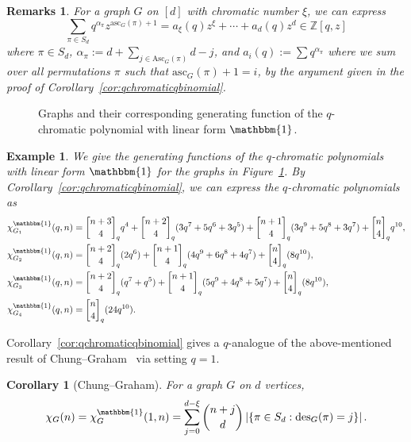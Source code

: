 \documentclass[11pt]{amsart}
\newtheorem{corollary}[theorem]{Corollary}
\newtheorem{exam}{Example}
\newenvironment{example}{\begin{exam}\sf}{\end{exam}}
\newtheorem*{rem}{Remarks}
\newenvironment{remark}{\begin{rem}\sf}{\end{rem}}
\newcommand{\asc}{\mathrm{Asc}}
\newcommand{\desnum}{\mathrm{des}}
\newcommand{\ascnum}{\mathrm{asc}}
\newcommand{\qbinom}[2]{\genfrac[]{0pt}{}{#1}{#2}_q}
\begin{document}
\begin{remark}
    For a graph $G$ on $[d]$ with chromatic number $\xi$, we can express
    \[
        \sum_{\pi \in S_d} q^{\alpha_\pi} z^{\ascnum_G(\pi)+1} = a_\xi (q) z^\xi+ \cdots + a_d(q) z^d \in
\mathbb{Z}[q,z]
    \]
    where $\pi \in S_d$, $\alpha_\pi := d+\sum_{j \in \asc_G(\pi)} d-j$, and $a_i(q) := \sum q^{\alpha_\pi}$ where we sum over all permutations $\pi$ such that $\ascnum_G(\pi)+1 = i$, by the argument given in the proof of Corollary~\ref{cor:qchromaticqbinomial}.
\end{remark}

\begin{figure}
    \centering
    
    \caption{Graphs and their corresponding generating function of the $q$-chromatic polynomial with linear form $\mathbbm{1}$.}
    \label{fig:numeratorpolynomial}
\end{figure}

\begin{example}\label{ex:qchromaticgenfunction}
    We give the generating functions of the $q$-chromatic polynomials with linear form $\mathbbm{1}$ for the
graphs in Figure~\ref{fig:numeratorpolynomial}. 
    By Corollary~\ref{cor:qchromaticqbinomial}, we can express the $q$-chromatic polynomials as
\begin{align*}
        \chi_{G_1}^\mathbbm{1}(q,n) &= \qbinom{n+3}{4} q^4 + \qbinom{n+2}{4} (3q^7+5q^6+3q^5) + \qbinom{n+1}{4} (3 q^9 + 5 q^8+3 q^7) + \qbinom{n}{4} q^{10},
    \\
        \chi_{G_2}^\mathbbm{1}(q,n) &=\qbinom{n+2}{4} (2q^6) + \qbinom{n+1}{4} (4 q^9+6q^8+4q^7) + \qbinom{n}{4} (8 q^{10}),
    \\
        \chi_{G_3}^\mathbbm{1}(q,n)  &= \qbinom{n+2}{4} (q^7+q^5) + \qbinom{n+1}{4} (5q^9+4q^8+5q^7) + \qbinom{n}{4} (8 q^{10}),
    \\
        \chi_{G_4}^\mathbbm{1}(q,n)  &= \qbinom{n}{4} (24 q^{10}).
\end{align*} 
\end{example}

Corollary~\ref{cor:qchromaticqbinomial} gives a $q$-analogue of the above-mentioned result of
Chung--Graham~\cite{chunggrahamcoverpol} via setting $q=1$.
\begin{corollary}[Chung--Graham]\label{cor:chunggraham}
    For a graph $G$ on $d$ vertices,
    \[
        \chi_G(n) = \chi^\mathbbm{1}_G(1,n) = \sum_{j=0}^{d-\xi} \binom{n+j}{d} \left|\{ \pi \in S_d :
\desnum_G(\pi)=j\} \right|.
    \] 
\end{corollary}
\end{document}
